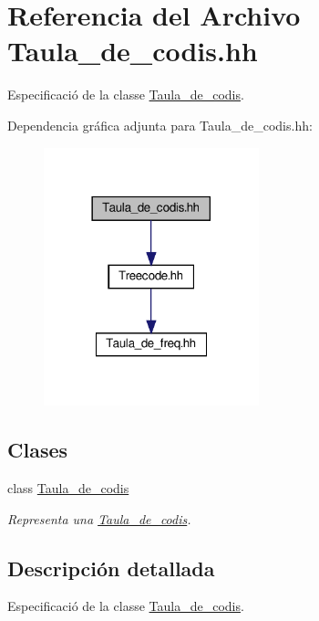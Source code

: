 \hypertarget{_taula__de__codis_8hh}{}\section{Referencia del Archivo Taula\+\_\+de\+\_\+codis.\+hh}
\label{_taula__de__codis_8hh}


Especificació de la classe \hyperlink{class_taula__de__codis}{Taula\+\_\+de\+\_\+codis}.  


Dependencia gráfica adjunta para Taula\+\_\+de\+\_\+codis.\+hh\+:\nopagebreak
\begin{figure}[H]
\begin{center}
\leavevmode
\includegraphics[width=177pt]{_taula__de__codis_8hh__incl}
\end{center}
\end{figure}
\subsection*{Clases}
\begin{DoxyCompactItemize}
\item 
class \hyperlink{class_taula__de__codis}{Taula\+\_\+de\+\_\+codis}
\begin{DoxyCompactList}\small\item\em Representa una \hyperlink{class_taula__de__codis}{Taula\+\_\+de\+\_\+codis}. \end{DoxyCompactList}\end{DoxyCompactItemize}


\subsection{Descripción detallada}
Especificació de la classe \hyperlink{class_taula__de__codis}{Taula\+\_\+de\+\_\+codis}. 

